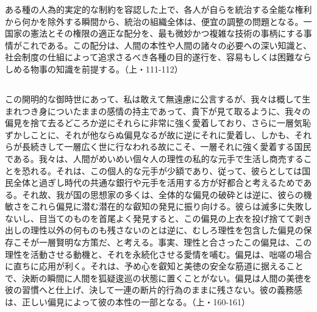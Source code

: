 ある種の人為的実定的な制約を容認した上で、各人が自らを統治する全能な権利から何かを除外する瞬間から、統治の組織全体は、便宜の調整の問題となる。一国家の憲法とその権限の適正な配分を、最も微妙かつ複雑な技術の事柄にする事情がこれである。この配分は、人間の本性や人間の諸々の必要への深い知識と、社会制度の仕組によって追求さるべき各種の目的遂行を、容易もしくは困難ならしめる物事の知識を前提する。（上・111-112）

\subsection{}




この開明的な御時世にあって、私は敢えて無遠慮に公言するが、我々は概して生まれつき身についたままの感情の持主であって、貴下が見て取るように、我々の偏見を捨て去るどころか逆にそれらに非常に強く愛着しており、さらに一層気恥ずかしことに、それが他ならぬ偏見なるが故に逆にそれに愛着し、しかも、それらが長続きして一層広く世に行なわれる故にこそ、一層それに強く愛着する国民である。我々は、人間がめいめい個々人の理性の私的な元手で生活し商売することを恐れる。それは、この個人的な元手が少額であり、従って、彼らとしては国民全体と過ぎし時代の共通な銀行や元手を活用する方が好都合と考えるためである。それ故、我が国の思想家の多くは、全体的な偏見の破砕とは逆に、彼らの機敏さをこれら偏見に潜む潜在的な叡知の発見に振り向ける。彼らは滅多に失敗しないし、目当てのものを首尾よく発見すると、この偏見の上衣を投げ捨てて剥き出しの理性以外の何ものも残さないのとは逆に、むしろ理性を包含した偏見の保存こそが一層賢明な方策だ、と考える。事実、理性と合さったこの偏見は、この理性を活動させる動機と、それを永続化させる愛情を哺む。偏見は、咄嗟の場合に直ちに応用が利く。それは、予め心を叡知と美徳の安全な筋道に据えることで、決断の瞬間に人間を狐疑逡巡の状態に置くことがない。偏見は人間の美徳を彼の習慣へと仕上げ、決して一連の断片的行為のままに残さない。彼の義務感は、正しい偏見によって彼の本性の一部となる。（上・160-161）

\subsection{}




